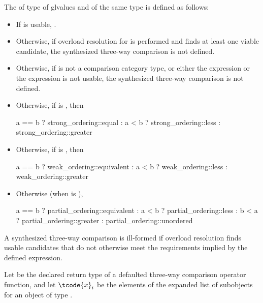 \pnum
The 
of type 
of glvalues  and  of the same type
is defined as follows:
\begin{itemize}
\item
If  is usable,
.

\item
Otherwise, if overload resolution for  is performed and
finds at least one viable candidate,
the synthesized three-way comparison is not defined.

\item
Otherwise, if  is not a comparison category type, or either
the expression  or the expression 
is not usable,
the synthesized three-way comparison is not defined.

\item
Otherwise, if  is , then
\begin{codeblock}
a == b ? strong_ordering::equal :
a < b  ? strong_ordering::less :
         strong_ordering::greater
\end{codeblock}

\item
Otherwise, if  is , then
\begin{codeblock}
a == b ? weak_ordering::equivalent :
a < b  ? weak_ordering::less :
         weak_ordering::greater
\end{codeblock}

\item
Otherwise (when  is ),
\begin{codeblock}
a == b ? partial_ordering::equivalent :
a < b  ? partial_ordering::less :
b < a  ? partial_ordering::greater :
         partial_ordering::unordered
\end{codeblock}
\end{itemize}

\begin{note}
A synthesized three-way comparison is ill-formed
if overload resolution finds usable candidates
that do not otherwise meet the requirements implied by the defined expression.
\end{note}

\pnum
Let  be the declared return type of
a defaulted three-way comparison operator function, and
let $\tcode{x}_i$ be the elements of
the expanded list of subobjects for
an object  of type .

